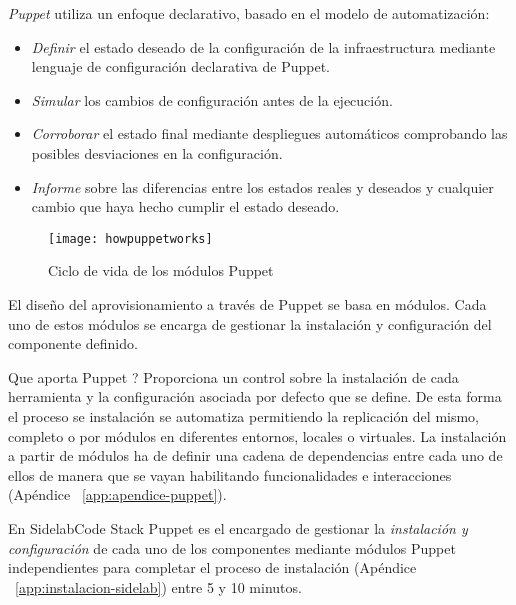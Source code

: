 \par \emph{Puppet} utiliza un enfoque declarativo, basado en el modelo de automatización:
\begin{itemize}
	\item \emph{Definir} el estado deseado de la configuración de la infraestructura mediante lenguaje de configuración declarativa de Puppet.
	\item \emph{Simular} los cambios de configuración antes de la ejecución.
	\item \emph{Corroborar} el estado final mediante despliegues automáticos comprobando las posibles desviaciones en la configuración.
	\item \emph{Informe} sobre las diferencias entre los estados reales y deseados y cualquier cambio que haya hecho cumplir el estado deseado.
\end{itemize}

\begin{figure}[H]
    \centering
    \texttt{[image: howpuppetworks]}
    \caption{Ciclo de vida de los módulos Puppet}
    \label{fig:howpuppetworks}
\end{figure}

\par El diseño del aprovisionamiento a través de Puppet se basa en módulos. Cada uno de estos módulos se encarga de gestionar la instalación y configuración del componente definido.

\par Que aporta Puppet ? Proporciona un control sobre la instalación de cada herramienta y la configuración asociada por defecto que se define. De esta forma el proceso se instalación se automatiza permitiendo la replicación del mismo, completo o por módulos en diferentes entornos, locales o virtuales. La instalación a partir de módulos ha de definir una cadena de dependencias entre cada uno de ellos de manera que se vayan habilitando funcionalidades e interacciones (Apéndice ~\ref{app:apendice-puppet}).

\par En SidelabCode Stack Puppet es el encargado de gestionar la \emph{instalación y configuración} de cada uno de los componentes mediante módulos Puppet independientes para completar el proceso de instalación (Apéndice ~\ref{app:instalacion-sidelab}) entre 5 y 10 minutos.


